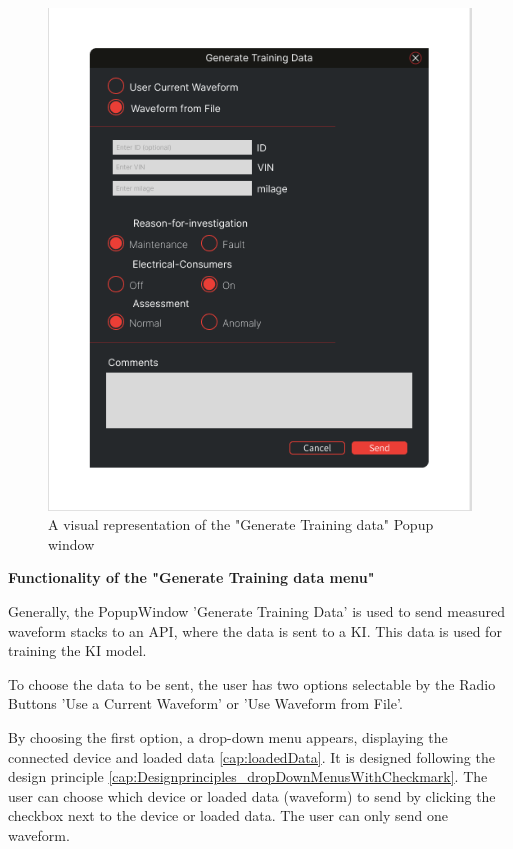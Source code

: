 \documentclass{scrreprt}
\begin{document}
\begin{figure}
    \includegraphics[width=.9\textwidth]{assets/pictures/GenerateTrainingDataMenu.png}
    \caption[]{A visual representation of the "Generate Training data" Popup window}
    \label{fig: Generate Training data Popupwindow}
\end{figure}

\textbf{Functionality of the "Generate Training data menu"}

Generally, the PopupWindow 'Generate Training Data' is used to send measured waveform stacks to an API, where the data is sent to a KI. This data is used for training the KI model.

To choose the data to be sent, the user has two options selectable by the Radio Buttons 'Use a Current Waveform' or 'Use Waveform from File'.

By choosing the first option, a drop-down menu appears, displaying the connected device and loaded data \ref{cap:loadedData}. It is designed following the design principle \ref{cap:Designprinciples_dropDownMenusWithCheckmark}. 
The user can choose which device or loaded data (waveform) to send by clicking the checkbox next to the device or loaded data. The user can only send one waveform.
\end{document}
